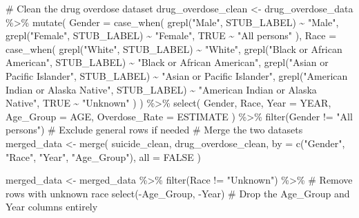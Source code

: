 \documentclass[
  letterpaper,
  DIV=11,
  numbers=noendperiod]{scrartcl}
\newenvironment{Shaded}{\begin{snugshade}}{\end{snugshade}}
\newcommand{\AttributeTok}[1]{\textcolor[rgb]{0.40,0.45,0.13}{#1}}
\newcommand{\CommentTok}[1]{\textcolor[rgb]{0.37,0.37,0.37}{#1}}
\newcommand{\ConstantTok}[1]{\textcolor[rgb]{0.56,0.35,0.01}{#1}}
\newcommand{\FunctionTok}[1]{\textcolor[rgb]{0.28,0.35,0.67}{#1}}
\newcommand{\NormalTok}[1]{\textcolor[rgb]{0.00,0.23,0.31}{#1}}
\newcommand{\OtherTok}[1]{\textcolor[rgb]{0.00,0.23,0.31}{#1}}
\newcommand{\SpecialCharTok}[1]{\textcolor[rgb]{0.37,0.37,0.37}{#1}}
\newcommand{\StringTok}[1]{\textcolor[rgb]{0.13,0.47,0.30}{#1}}
\begin{document}
\begin{Shaded}
\begin{Highlighting}[]
\CommentTok{\# Clean the drug overdose dataset}
\NormalTok{drug\_overdose\_clean }\OtherTok{\textless{}{-}}\NormalTok{ drug\_overdose\_data }\SpecialCharTok{\%\textgreater{}\%}
  \FunctionTok{mutate}\NormalTok{(}
    \AttributeTok{Gender =} \FunctionTok{case\_when}\NormalTok{(}
      \FunctionTok{grepl}\NormalTok{(}\StringTok{"Male"}\NormalTok{, STUB\_LABEL) }\SpecialCharTok{\textasciitilde{}} \StringTok{"Male"}\NormalTok{,}
      \FunctionTok{grepl}\NormalTok{(}\StringTok{"Female"}\NormalTok{, STUB\_LABEL) }\SpecialCharTok{\textasciitilde{}} \StringTok{"Female"}\NormalTok{,}
      \ConstantTok{TRUE} \SpecialCharTok{\textasciitilde{}} \StringTok{"All persons"}
\NormalTok{    ),}
    \AttributeTok{Race =} \FunctionTok{case\_when}\NormalTok{(}
      \FunctionTok{grepl}\NormalTok{(}\StringTok{"White"}\NormalTok{, STUB\_LABEL) }\SpecialCharTok{\textasciitilde{}} \StringTok{"White"}\NormalTok{,}
      \FunctionTok{grepl}\NormalTok{(}\StringTok{"Black or African American"}\NormalTok{, STUB\_LABEL) }\SpecialCharTok{\textasciitilde{}} \StringTok{"Black or African American"}\NormalTok{,}
      \FunctionTok{grepl}\NormalTok{(}\StringTok{"Asian or Pacific Islander"}\NormalTok{, STUB\_LABEL) }\SpecialCharTok{\textasciitilde{}} \StringTok{"Asian or Pacific Islander"}\NormalTok{,}
      \FunctionTok{grepl}\NormalTok{(}\StringTok{"American Indian or Alaska Native"}\NormalTok{, STUB\_LABEL) }\SpecialCharTok{\textasciitilde{}} \StringTok{"American Indian or Alaska Native"}\NormalTok{,}
      \ConstantTok{TRUE} \SpecialCharTok{\textasciitilde{}} \StringTok{"Unknown"}
\NormalTok{    )}
\NormalTok{  ) }\SpecialCharTok{\%\textgreater{}\%}
  \FunctionTok{select}\NormalTok{(}
\NormalTok{    Gender,}
\NormalTok{    Race,}
    \AttributeTok{Year =}\NormalTok{ YEAR,}
    \AttributeTok{Age\_Group =}\NormalTok{ AGE,}
    \AttributeTok{Overdose\_Rate =}\NormalTok{ ESTIMATE}
\NormalTok{  ) }\SpecialCharTok{\%\textgreater{}\%}
  \FunctionTok{filter}\NormalTok{(Gender }\SpecialCharTok{!=} \StringTok{"All persons"}\NormalTok{) }\CommentTok{\# Exclude general rows if needed}
\CommentTok{\# Merge the two datasets}
\NormalTok{merged\_data }\OtherTok{\textless{}{-}} \FunctionTok{merge}\NormalTok{(}
\NormalTok{  suicide\_clean,}
\NormalTok{  drug\_overdose\_clean,}
  \AttributeTok{by =} \FunctionTok{c}\NormalTok{(}\StringTok{"Gender"}\NormalTok{, }\StringTok{"Race"}\NormalTok{, }\StringTok{"Year"}\NormalTok{, }\StringTok{"Age\_Group"}\NormalTok{),}
  \AttributeTok{all =} \ConstantTok{FALSE} 
\NormalTok{)}

\NormalTok{merged\_data }\OtherTok{\textless{}{-}}\NormalTok{ merged\_data }\SpecialCharTok{\%\textgreater{}\%}
  \FunctionTok{filter}\NormalTok{(Race }\SpecialCharTok{!=} \StringTok{"Unknown"}\NormalTok{) }\SpecialCharTok{\%\textgreater{}\%} \CommentTok{\# Remove rows with unknown race}
  \FunctionTok{select}\NormalTok{(}\SpecialCharTok{{-}}\NormalTok{Age\_Group, }\SpecialCharTok{{-}}\NormalTok{Year)     }\CommentTok{\# Drop the Age\_Group and Year columns entirely}


\end{Highlighting}
\end{Shaded}
\end{document}
